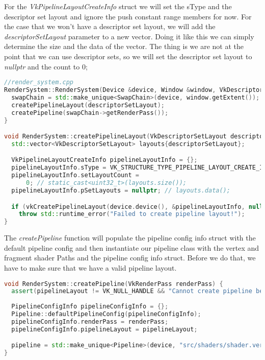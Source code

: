 \documentclass[12pt]{report} \usepackage{preamble}
\begin{document}
For the \textit{VkPipelineLayoutCreateInfo} struct we will set the sType and the descriptor set layout and ignore the
push constant range members for now. For the case that we won't have a descriptor set layout, we will add the \textit{descriptorSetLayout}
parameter to a new vector. Doing it like this we can simply determine the size and the data of the vector. The thing is we are
not at the point that we can use descriptor sets, so we will set the descriptor set layout to \textit{nullptr} and the count to 0;

\begin{lstlisting}[language=C++]
//render_system.cpp
RenderSystem::RenderSystem(Device &device, Window &window, VkDescriptorSetLayout descriptorSetLayout) : device{device} {
  swapChain = std::make_unique<SwapChain>(device, window.getExtent());
  createPipelineLayout(descriptorSetLayout);
  createPipeline(swapChain->getRenderPass());
}

void RenderSystem::createPipelineLayout(VkDescriptorSetLayout descriptorSetLayout) {
  std::vector<VkDescriptorSetLayout> layouts{descriptorSetLayout};

  VkPipelineLayoutCreateInfo pipelineLayoutInfo = {};
  pipelineLayoutInfo.sType = VK_STRUCTURE_TYPE_PIPELINE_LAYOUT_CREATE_INFO;
  pipelineLayoutInfo.setLayoutCount =
      0; // static_cast<uint32_t>(layouts.size());
  pipelineLayoutInfo.pSetLayouts = nullptr; // layouts.data();

  if (vkCreatePipelineLayout(device.device(), &pipelineLayoutInfo, nullptr, &pipelineLayout) != VK_SUCCESS)
    throw std::runtime_error("Failed to create pipeline layout!");
}
\end{lstlisting}

The \textit{createPipeline} function will populate the pipeline config info struct with the default pipeline config and
then instantiate our pipeline class with the vertex and fragment shader Paths and the pipeline config info struct.
Before we do that, we have to make sure that we have a valid pipeline layout.

\begin{lstlisting}[language=C++]
void RenderSystem::createPipeline(VkRenderPass renderPass) {
  assert(pipelineLayout != VK_NULL_HANDLE && "Cannot create pipeline before pipeline layout!");
  
  PipelineConfigInfo pipelineConfigInfo = {};
  Pipeline::defaultPipelineConfig(pipelineConfigInfo);
  pipelineConfigInfo.renderPass = renderPass;
  pipelineConfigInfo.pipelineLayout = pipelineLayout;

  pipeline = std::make_unique<Pipeline>(device, "src/shaders/shader.vert.spv", "src/shaders/shader.frag.spv", pipelineConfigInfo);
}
\end{lstlisting}
\end{document}
